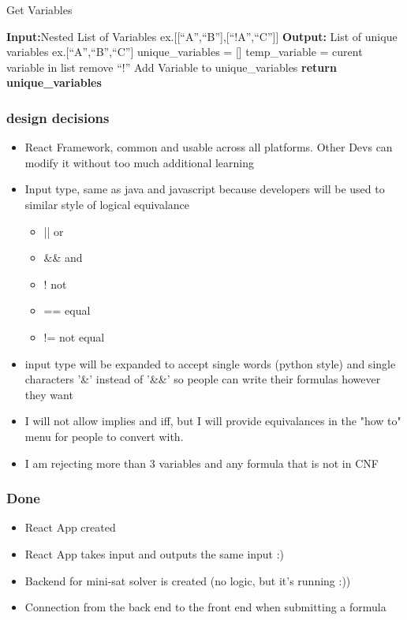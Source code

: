 \documentclass{article}
\begin{document}
    \begin{algorithm}
        \caption{Get Variables}
        \begin{algorithmic}
        \State \textbf{Input:}Nested List of Variables \Comment ex.[[``A'',``B''],[``!A'',``C'']]
        \State \textbf{Output:} List of unique variables \Comment ex.[``A'',``B'',``C'']
        \State unique\_variables  = []
        \State temp\_variable = curent variable in list
            \State remove ``!''
        \EndIf
            \State Add Variable to unique\_variables
        \EndIf
        \EndWhile
        \State \textbf{return unique\_variables} 
        \end{algorithmic}
    \end{algorithm}


\subsubsection*{design decisions}
\begin{itemize}
    \item React Framework, common and usable across all platforms. Other Devs can modify it without too much additional learning
    \item Input type, same as java and javascript because developers will be used to similar style of logical equivalance
    \begin{itemize}
        \item || or
        \item \&\& and
        \item ! not
        \item == equal
        \item != not equal
    \end{itemize}
    \item input type will be expanded to accept single words (python style) and single characters '\&' instead of '\&\&' so people can write their formulas however they want
    \item I will not allow implies and iff, but I will provide equivalances in the "how to" menu for people to convert with.
    \item I am rejecting more than 3 variables and any formula that is not in CNF
\end{itemize}

\subsubsection*{Done}
\begin{itemize}
    \item React App created
    \item React App takes input and outputs the same input :)
    \item Backend for mini-sat solver is created (no logic, but it's running :))
    \item Connection from the back end to the front end when submitting a formula
\end{itemize}
\end{document}
